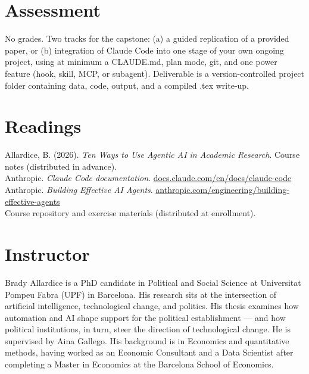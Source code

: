 \documentclass[11pt]{article}
\begin{document}
\section*{Assessment}

No grades. Two tracks for the capstone: (a) a guided replication of a provided paper, or (b) integration of Claude Code into one stage of your own ongoing project, using at minimum a CLAUDE.md, plan mode, git, and one power feature (hook, skill, MCP, or subagent). Deliverable is a version-controlled project folder containing data, code, output, and a compiled .tex write-up.

\section*{Readings}

Allardice, B. (2026). \emph{Ten Ways to Use Agentic AI in Academic Research}. Course notes (distributed in advance). \\
Anthropic. \emph{Claude Code documentation}. \href{https://docs.claude.com/en/docs/claude-code}{docs.claude.com/en/docs/claude-code} \\
Anthropic. \emph{Building Effective AI Agents}. \href{https://www.anthropic.com/engineering/building-effective-agents}{anthropic.com/engineering/building-effective-agents} \\
Course repository and exercise materials (distributed at enrollment).

\section*{Instructor}

Brady Allardice is a PhD candidate in Political and Social Science at Universitat Pompeu Fabra (UPF) in Barcelona. His research sits at the intersection of artificial intelligence, technological change, and politics. His thesis examines how automation and AI shape support for the political establishment — and how political institutions, in turn, steer the direction of technological change. He is supervised by Aina Gallego. His background is in Economics and quantitative methods, having worked as an Economic Consultant and a Data Scientist after completing a Master in Economics at the Barcelona School of Economics.
\end{document}
